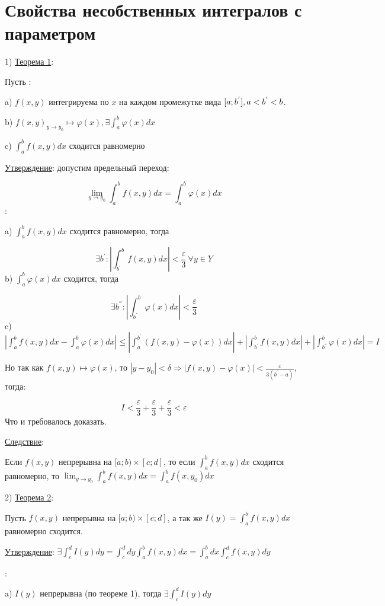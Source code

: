 \documentclass[12pt]{article}
\begin{document}
\section{Свойства несобственных интегралов с параметром}
1) \uline{Теорема 1}:\par
Пусть :\par
a) $f(x,y)$ интегрируема по $x$ на каждом промежутке вида $[a;b^{'}],\\ a < b^{'} < b$.\par
b) $f(x,y)_{y\to y_0} \mapsto \varphi(x), \exists \int_a^b \varphi(x) dx$\par
c) $\int_a^b f(x,y) dx$ сходится равномерно\par
\uline{Утверждение}: допустим предельный переход:\par
$$\lim_{y\to y_0} \int_a^b f(x,y) dx = \int_a^b \varphi(x) dx$$
:\par
a) $\int_a^b f(x,y) dx$ сходится равномерно, тогда\par
$$\exists b^{'} : |\int_{b^{'}}^{b} f(x, y) dx| < \frac{\varepsilon}{3} \ \forall y \in Y$$
b) $\int_a^b \varphi(x) dx$ сходится, тогда\par
$$\exists b^{''}: |\int_{b^{''}}^{b} \varphi(x) dx| < \frac{\varepsilon}{3}$$
c) $|\int_a^b f(x,y) dx - \int_a^b \varphi(x) dx| \leq |\int_a^{b^{'}} (f(x,y) - \varphi(x)) dx | + |\int_{b^{'}}^{b} f(x,y) dx | + |\int_{b^{''}}^b \varphi(x) dx| = I$\par
Но так как $f(x,y) \mapsto \varphi(x)$, то $|y - y_0| < \delta \Rightarrow |f(x,y) - \varphi(x)| < \frac{\varepsilon}{3(b^{'}-a)}$, тогда:\par
$$I < \frac{\varepsilon}{3} + \frac{\varepsilon}{3} + \frac{\varepsilon}{3} < \varepsilon$$
Что и требовалось доказать.\par
\uline{Следствие}:\par
Если $f(x,y)$ непрерывна на $[a;b) \times [c;d]$, то если $\int_a^b f(x,y) dx$ сходится равномерно, то $\lim_{y \to y_0} \int_a^b f(x,y) dx = \int_a^b f(x,y_0) dx$\par
2) \uline{Теорема 2}:\par
Пусть $f(x,y)$ непрерывна на $[a; b) \times [c;d]$, а так же $I(y) = \int_a^b f(x,y) dx$ равномерно сходится.\par
\uline{Утверждение}: $\exists \int_c^d I(y) dy = \int_c^d dy \int_a^b f(x,y) dx = \int_a^b dx \int_c^d f(x,y) dy$\par
{}:\par
a) $I(y)$ непрерывна (по теореме 1), тогда $\exists \int_c^d I(y) dy$\par
\end{document}
